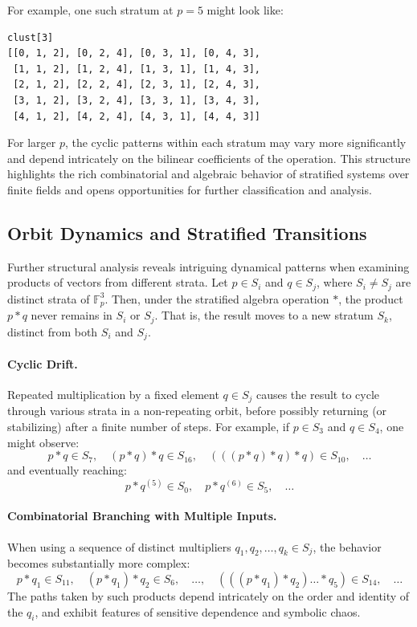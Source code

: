 \documentclass[12pt]{article}
\theoremstyle{definition}
\theoremstyle{plain}
\theoremstyle{remark}
\begin{document}
For example, one such stratum at \( p = 5 \) might look like:
\begin{verbatim}
clust[3]
[[0, 1, 2], [0, 2, 4], [0, 3, 1], [0, 4, 3],
 [1, 1, 2], [1, 2, 4], [1, 3, 1], [1, 4, 3],
 [2, 1, 2], [2, 2, 4], [2, 3, 1], [2, 4, 3],
 [3, 1, 2], [3, 2, 4], [3, 3, 1], [3, 4, 3],
 [4, 1, 2], [4, 2, 4], [4, 3, 1], [4, 4, 3]]
\end{verbatim}

For larger \( p \), the cyclic patterns within each stratum may vary more significantly and depend intricately on the bilinear coefficients of the operation. This structure highlights the rich combinatorial and algebraic behavior of stratified systems over finite fields and opens opportunities for further classification and analysis.

\subsection{Orbit Dynamics and Stratified Transitions}

Further structural analysis reveals intriguing dynamical patterns when examining products of vectors from different strata. Let \( p \in S_i \) and \( q \in S_j \), where \( S_i \neq S_j \) are distinct strata of \( \mathbb{F}_p^3 \). Then, under the stratified algebra operation \( * \), the product \( p * q \) never remains in \( S_i \) or \( S_j \). That is, the result moves to a new stratum \( S_k \), distinct from both \( S_i \) and \( S_j \).

\paragraph{Cyclic Drift.} Repeated multiplication by a fixed element \( q \in S_j \) causes the result to cycle through various strata in a non-repeating orbit, before possibly returning (or stabilizing) after a finite number of steps. For example, if \( p \in S_3 \) and \( q \in S_4 \), one might observe:
\[
p * q \in S_7,\quad (p * q) * q \in S_{16},\quad (((p * q) * q) * q) \in S_{10},\quad \dots
\]
and eventually reaching:
\[
p * q^{(5)} \in S_0,\quad p * q^{(6)} \in S_5,\quad \dots
\]

\paragraph{Combinatorial Branching with Multiple Inputs.} When using a sequence of distinct multipliers \( q_1, q_2, \dots, q_k \in S_j \), the behavior becomes substantially more complex:
\[
p * q_1 \in S_{11},\quad (p * q_1) * q_2 \in S_6,\quad \dots,\quad (((p * q_1) * q_2) \dots * q_5) \in S_{14},\quad \dots
\]
The paths taken by such products depend intricately on the order and identity of the \( q_i \), and exhibit features of sensitive dependence and symbolic chaos.
\end{document}
